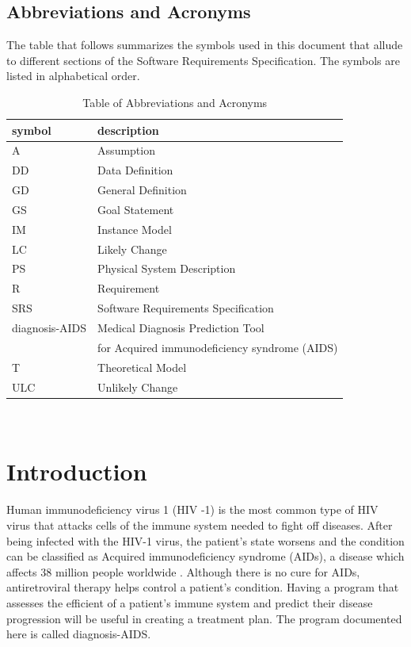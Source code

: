 \documentclass[12pt]{article}
\begin{document}
\subsection{Abbreviations and Acronyms}

The table that follows summarizes the symbols used in this document that allude 
to different sections of the Software Requirements Specification. The symbols 
are listed in alphabetical order.

\begin{table}[ht]
\begin{center}
\renewcommand{\arraystretch}{1.2}
\begin{tabular}{l l} 
  \toprule		
  \textbf{symbol} & \textbf{description}\\
  \midrule 
  A & Assumption\\
  DD & Data Definition\\
  GD & General Definition\\
  GS & Goal Statement\\
  IM & Instance Model\\
  LC & Likely Change\\
  PS & Physical System Description\\
  R & Requirement\\
  SRS & Software Requirements Specification\\
  diagnosis-AIDS & Medical Diagnosis Prediction Tool \\
   & for Acquired immunodeficiency syndrome (AIDS)\\
  T & Theoretical Model\\
  ULC & Unlikely Change\\
  \bottomrule
\end{tabular}\\
\end{center}
\caption{Table of Abbreviations and Acronyms}

\end{table}


\newpage



\section{Introduction}

Human immunodeficiency virus 1 (HIV -1) is the most common type of HIV virus 
that attacks cells of the immune system needed to fight off diseases. After 
being infected with the HIV-1 virus, the patient's state worsens and the 
condition can be classified as Acquired immunodeficiency syndrome (AIDs), a 
disease which affects 38 million people worldwide \citep{who}. Although there is 
no cure for AIDs, antiretroviral therapy helps control a patient's condition. 
Having a program that assesses the efficient of a patient's immune system and 
predict their disease progression will be useful in creating a treatment plan. 
The program documented here is called diagnosis-AIDS.
\end{document}
